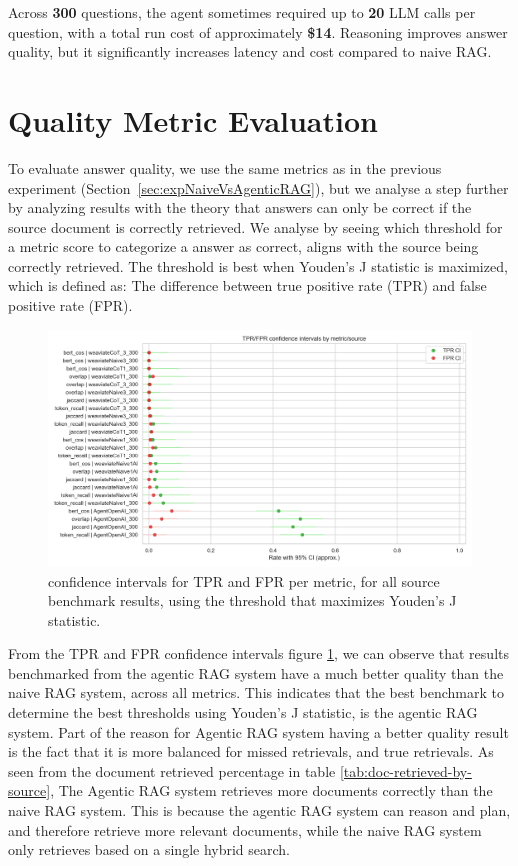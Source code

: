 Across \textbf{300} questions, the agent sometimes required up to \textbf{20} LLM calls per question, with a total run cost of approximately \textbf{\$14}. Reasoning improves answer quality, but it significantly increases latency and cost compared to naive RAG.

\section{Quality Metric Evaluation}
\label{sec:metric-evaluation-quality}
To evaluate answer quality, we use the same metrics as in the previous experiment (Section~\ref{sec:expNaiveVsAgenticRAG}), but we analyse a step further by analyzing results with the theory that answers can only be correct if the source document is correctly retrieved. We analyse by seeing which threshold for a metric score to categorize a answer as correct, aligns with the source being correctly retrieved. The threshold is best when Youden's J statistic is maximized, which is defined as: The difference between true positive rate (TPR) and false positive rate (FPR).
\begin{figure}[H]
    \centering
    \includegraphics[width=1\linewidth]{Figures/06_tpr_fpr_confidence_intervals.png}
    \caption{confidence intervals for TPR and FPR per metric, for all source benchmark results, using the threshold that maximizes Youden's J statistic.}
    \label{fig:confidence-intervals}
\end{figure}

From the TPR and FPR confidence intervals figure \ref{fig:confidence-intervals}, we can observe that results benchmarked from the agentic RAG system have a much better quality than the naive RAG system, across all metrics. This indicates that the best benchmark to determine the best thresholds using Youden's J statistic, is the agentic RAG system. Part of the reason for Agentic RAG system having a better quality result is the fact that it is more balanced for missed retrievals, and true retrievals. As seen from the document retrieved percentage in table \ref{tab:doc-retrieved-by-source},
The Agentic RAG system retrieves more documents correctly than the naive RAG system. This is because the agentic RAG system can reason and plan, and therefore retrieve more relevant documents, while the naive RAG system only retrieves based on a single hybrid search.

